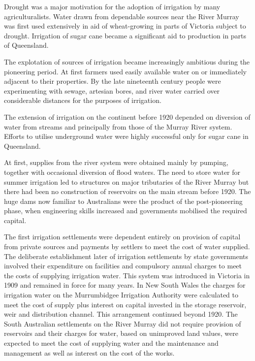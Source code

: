 Drought was a major motivation for the adoption of
irrigation by many agriculturalists. Water drawn from dependable
sources near the River Murray was first used
extensively in aid of wheat-growing in parts of Victoria
subject to drought. Irrigation of sugar cane became a significant aid to production in parts of
Queensland.

The explotation of sources of irrigation became increasingly ambitious
during the pioneering period. At first farmers used easily available
water on or immediately adjacent to their properties. By the late
nineteenth century people were experimenting with
sewage, artesian bores, and river
water carried over considerable distances for the purposes of
irrigation.

The extension of irrigation on the continent before 1920 depended on
diversion of water from streams and principally from those of the
Murray River system.  Efforts to utilise
underground water were highly successful only for sugar cane in Queensland.

At first, supplies from the river system were obtained mainly by
pumping, together with occasional diversion of flood
waters.  The need to store water for summer irrigation led to
structures on major tributaries of the River Murray but there had been
no construction of reservoirs on the main
stream before 1920. The huge dams now familiar to Australians were the
product of the post-pioneering phase, when engineering skills
increased and governments mobilised the required capital.

\bigskip\noindent The first irrigation settlements were dependent
entirely on provision of capital from private sources and payments by
settlers to meet the cost of water supplied.  The deliberate
establishment later of irrigation settlements by state governments
involved their expenditure on facilities and compulsory annual charges
to meet the costs of supplying irrigation water.  This
system was introduced in Victoria in 1909 and remained in force for
many years.  In New South Wales the charges for irrigation water on
the Murrumbidgee Irrigation Authority were calculated to meet the cost
of supply plus interest on capital invested in the storage
reservoir, weir and distribution
channel.  This arrangement continued beyond
1920.  The South Australian settlements on the
River Murray did not require provision of
reservoirs and their charges for water,
based on unimproved land values, were expected to meet the cost of
supplying water and the maintenance and management as well as interest
on the cost of the works.

